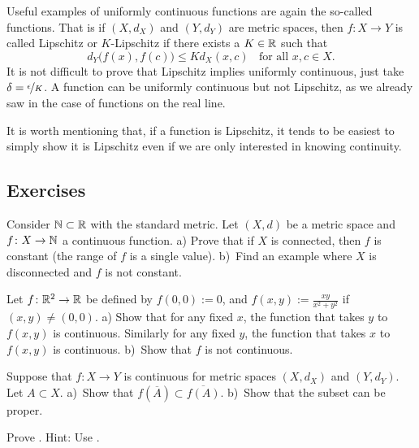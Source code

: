 \begin{example}
Useful examples of uniformly continuous functions are again the so-called
\emph{} functions.  That is if
$(X,d_X)$ and $(Y,d_Y)$ are metric spaces, then $f \colon X \to Y$
is called Lipschitz or $K$-Lipschitz if there exists a $K \in {\mathbb{R}}$ such that
\begin{equation*}
d_Y\bigl(f(x),f(c)\bigr) \leq K d_X(x,c)
\ \ \ \ \text{for all } x,c \in X.
\end{equation*}
It is not difficult to prove that Lipschitz implies uniformly continuous,
just take $\delta = \nicefrac{\epsilon}{K}$.
A function can be uniformly continuous
but not Lipschitz,
as we already saw in the case
of functions on the real line.

It is worth mentioning that,
if a function is Lipschitz, it tends to be
easiest to simply show it is Lipschitz even if we are only
interested in knowing continuity.
\end{example}

\subsection{Exercises}

\begin{exercise}
Consider ${\mathbb{N}} \subset {\mathbb{R}}$ with the standard metric.  Let $(X,d)$ be a
metric space and $f \colon X \to {\mathbb{N}}$ a continuous function.  a) Prove that
if $X$ is connected, then $f$ is constant (the range of $f$ is a single
value).  b)~Find an example where $X$ is disconnected and $f$ is not constant.
\end{exercise}

\begin{exercise} \label{exercise:dicontR2}
Let $f \colon {\mathbb{R}}^2 \to {\mathbb{R}}$ be defined by $f(0,0) := 0$, and
$f(x,y) := \frac{xy}{x^2+y^2}$ if $(x,y) \not= (0,0)$.  a) Show that for any fixed $x$,
the function that takes $y$ to $f(x,y)$ is continuous.  Similarly
for any fixed $y$, the function that takes $x$ to $f(x,y)$ is continuous.
b)~Show that $f$ is not continuous.
\end{exercise}

\begin{exercise} 
Suppose that $f \colon X \to Y$ is continuous for metric spaces $(X,d_X)$
and $(Y,d_Y)$.  Let $A \subset X$.  a)~Show that $f(\overline{A}) \subset
\overline{f(A)}$.  b)~Show that the subset can be proper.
\end{exercise}

\begin{exercise}
Prove .  Hint: Use .
\end{exercise}

